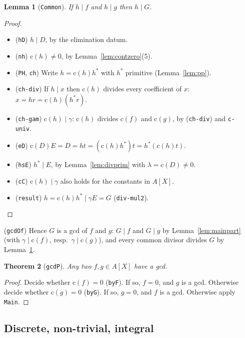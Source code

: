 \documentclass[11pt]{amsart}
\newtheorem{theorem}{Theorem}[section]
\newtheorem{lemma}[theorem]{Lemma}
\theoremstyle{definition}
\theoremstyle{remark}
\newcommand{\nm}[1]{\textup{\texttt{#1}}}
\newcommand{\cont}{\mathrm{c}}
\begin{document}
\begin{lemma}[\nm{Common}]\label{lem:maincommon}
If $h\mid f$ and $h\mid g$ then $h\mid G$.
\end{lemma}
\begin{proof}
\begin{itemize}
\item (\nm{hD}) $h\mid D$, by the elimination datum.
\item (\nm{nh}) $\cont(h)\neq0$, by Lemma~\ref{lem:contzero}(5).
\item (\nm{PH}, \nm{ch}) Write $h = \cont(h)h^*$ with $h^*$ primitive
  (Lemma~\ref{lem:pp}).
\item (\nm{ch-div}) If $h\mid x$ then $\cont(h)$ divides every
  coefficient of $x$: $x = hr = \cont(h)(h^*r)$.
\item (\nm{ch-gam}) $\cont(h)\mid\gamma$: $\cont(h)$ divides $\cont(f)$
  and $\cont(g)$, by (\nm{ch-div}) and \nm{c-univ}.
\item (\nm{eD}) $\cont(D)E = D = ht = (\cont(h)h^*)t = h^*(\cont(h)t)$.
\item (\nm{hsE}) $h^*\mid E$, by Lemma~\ref{lem:divprim} with
  $\lambda = \cont(D)\neq0$.
\item (\nm{cC}) $\cont(h)\mid\gamma$ also holds for the constants in
  $A[X]$.
\item (\nm{result}) $h = \cont(h)h^*\mid\gamma E = G$
  (\nm{div-mul2}).\qedhere
\end{itemize}
\end{proof}

\noindent (\nm{gcdOf}) Hence $G$ is a gcd of $f$ and $g$:
$G\mid f$ and $G\mid g$ by Lemma~\ref{lem:mainpart} (with
$\gamma\mid\cont(f)$, resp.\ $\gamma\mid\cont(g)$), and every common
divisor divides $G$ by Lemma~\ref{lem:maincommon}.

\begin{theorem}[\nm{gcdP}]\label{thm:gcdP}
Any two $f,g\in A[X]$ have a gcd.
\end{theorem}
\begin{proof}
Decide whether $\cont(f) = 0$ (\nm{byF}). If so, $f = 0$, and $g$ is a
gcd. Otherwise decide whether $\cont(g) = 0$ (\nm{byG}). If so, $g = 0$,
and $f$ is a gcd. Otherwise apply \nm{Main}.
\end{proof}

\subsection{Discrete, non-trivial, integral}
\end{document}
